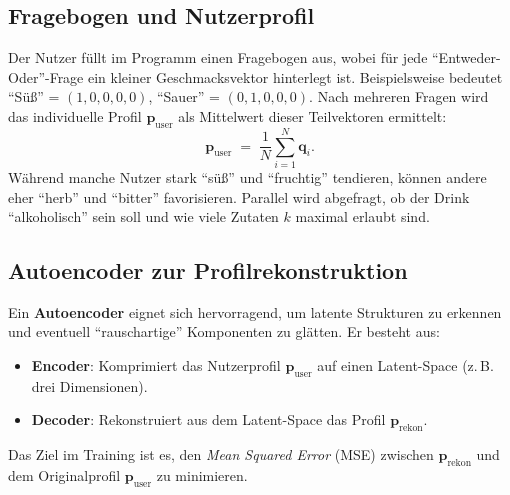 \documentclass[12pt,a4paper]{report}
\begin{document}
\subsection{Fragebogen und Nutzerprofil}
Der Nutzer füllt im Programm einen Fragebogen aus, wobei für jede \enquote{Entweder-Oder}-Frage ein kleiner Geschmacksvektor hinterlegt ist. Beispielsweise bedeutet \enquote{Süß} = \((1,0,0,0,0)\), \enquote{Sauer} = \((0,1,0,0,0)\). Nach mehreren Fragen wird das individuelle Profil \(\mathbf{p}_{\text{user}}\) als Mittelwert dieser Teilvektoren ermittelt:
\[
\mathbf{p}_{\text{user}} \;=\; \frac{1}{N} \sum_{i=1}^{N} \mathbf{q}_i.
\]
Während manche Nutzer stark \enquote{süß} und \enquote{fruchtig} tendieren, können andere eher \enquote{herb} und \enquote{bitter} favorisieren. Parallel wird abgefragt, ob der Drink \enquote{alkoholisch} sein soll und wie viele Zutaten \(k\) maximal erlaubt sind.

\subsection{Autoencoder zur Profilrekonstruktion}
Ein \textbf{Autoencoder} eignet sich hervorragend, um latente Strukturen zu erkennen und eventuell \enquote{rauschartige} Komponenten zu glätten. Er besteht aus:
\begin{itemize}
  \item \textbf{Encoder}: Komprimiert das Nutzerprofil \(\mathbf{p}_{\text{user}}\) auf einen Latent-Space (z.\,B. drei Dimensionen).
  \item \textbf{Decoder}: Rekonstruiert aus dem Latent-Space das Profil \(\mathbf{p}_{\text{rekon}}\).
\end{itemize}
Das Ziel im Training ist es, den \emph{Mean Squared Error} (MSE) zwischen \(\mathbf{p}_{\text{rekon}}\) und dem Originalprofil \(\mathbf{p}_{\text{user}}\) zu minimieren.
\end{document}
